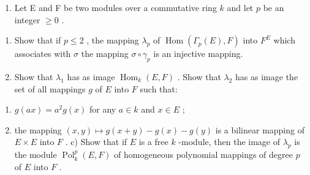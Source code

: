 \begin{enumerate}
\def\labelenumi{\arabic{enumi})}
\setcounter{enumi}{15}
\tightlist
\item
  Let E and F be two modules over a commutative ring \(k\) and let \(p\) be an integer \(\geqslant 0\) .
\end{enumerate}

\begin{enumerate}
\def\labelenumi{\alph{enumi})}
\item
  Show that if \(p \leqslant 2\) , the mapping \(\lambda_p\) of \(\operatorname{Hom}(\Gamma_p(E), F)\) into \(F^E\) which associates with \(\sigma\) the mapping \(\sigma \circ \gamma_p\) is an injective mapping.
\item
  Show that \(\lambda_1\) has as image \(\operatorname{Hom}_k(E, F)\) . Show that \(\lambda_2\) has as image the set of all mappings \(g\) of \(E\) into \(F\) such that:
\end{enumerate}

\begin{enumerate}
\def\labelenumi{(\roman{enumi})}
\item
  \(g(ax) = a^2 g(x)\) for any \(a \in k\) and \(x \in E\) ;
\item
  the mapping \((x, y) \mapsto g(x + y) - g(x) - g(y)\) is a bilinear mapping of \(E \times E\) into \(F\) . c) Show that if \(E\) is a free \(k\) -module, then the image of \(\lambda_p\) is the module \(\operatorname{Pol}_k^p(E, F)\) of homogeneous polynomial mappings of degree \(p\) of \(E\) into \(F\) .
\end{enumerate}

